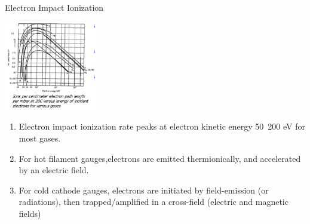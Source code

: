 \documentclass[11pt]{beamer}
\begin{document}
\begin{frame}{Electron Impact Ionization}

	    \begin{center}
			\includegraphics[width=0.3\textwidth]{ElectImpactIonization.png}
		\end{center}	

\begin{enumerate}
\item Electron impact ionization rate peaks at electron kinetic energy 50~200 eV for most gases.
\item For hot filament gauges,electrons are emitted thermionically, and accelerated by an electric field.
\item For cold cathode gauges, electrons are initiated by field-emission (or radiations), then trapped/amplified in a cross-field (electric and magnetic fields)
\end {enumerate}



\end{frame}
\end{document}
